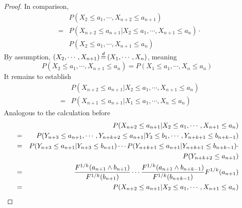 \documentclass{report}
\begin{document}
\begin{enumerate}[1.]
\begin{enumerate}[(a)]
\begin{proof}
    In comparison,
    \begin{eqnarray*}
      && P(X_2 \le a_1, \cdots, X_{n+2} \le a_{n+1}) \\
      &=& P(X_{n+2} \le a_{n+1} | X_2 \le a_1, \cdots, X_{n+1} \le
      a_{n}) \cdot \\
      && P(X_2 \le a_1, \cdots, X_{n+1} \le a_{n})
    \end{eqnarray*}
    By assumption, $(X_2, \cdots, X_{n+1}) \ed (X_1, \cdots, X_{n})$,
    meaning
    \[
    P(X_2 \le a_1, \cdots, X_{n+1} \le a_{n}) = P(X_1 \le
    a_1, \cdots, X_{n} \le a_{n})
    \]
    It remains to establish
    \begin{eqnarray*}
    && P(X_{n+2} \le a_{n+1} | X_2 \le a_1, \cdots, X_{n+1} \le
    a_{n}) \\
    &=& P(X_{n+1} \le a_{n+1} | X_1 \le a_1, \cdots, X_{n} \le
    a_{n})
    \end{eqnarray*}
    Analogous to the calculation before
    \begin{eqnarray*}
      && P(X_{n+2} \le a_{n+1} | X_2 \le a_1, \cdots, X_{n+1} \le
      a_{n})      \\
      &=& P(Y_{n+3} \le a_{n+1}, \cdots, Y_{n+k+2} \le a_{n+1} | Y_3
      \le b_1, \cdots, Y_{n+k+1} \le b_{n+k-1}) \\
      &=& P(Y_{n+3} \le a_{n+1} | Y_{n+3} \le b_{n+1}) \cdots
      P(Y_{n+k+1} \le a_{n+1} | Y_{n+k+1} \le b_{n+k-1}) \cdot \\
      && P(Y_{n+k+2} \le a_{n+1}) \\
      &=& {F^{1/k}(a_{n+1} \wedge b_{n+1}) \over F^{1/k}(b_{n+1})} \cdots
      {F^{1/k}(a_{n+1} \wedge b_{n+k-1}) \over F^{1/k}(b_{n+k-1})}
      F^{1/k}(a_{n+1}) \\
      &=& P(X_{n+2} \le a_{n+1} | X_2 \le a_1, \cdots, X_{n+1} \le
      a_{n})\\
    \end{eqnarray*}
  \end{proof}


\end{enumerate}
\end{enumerate}
\end{document}
